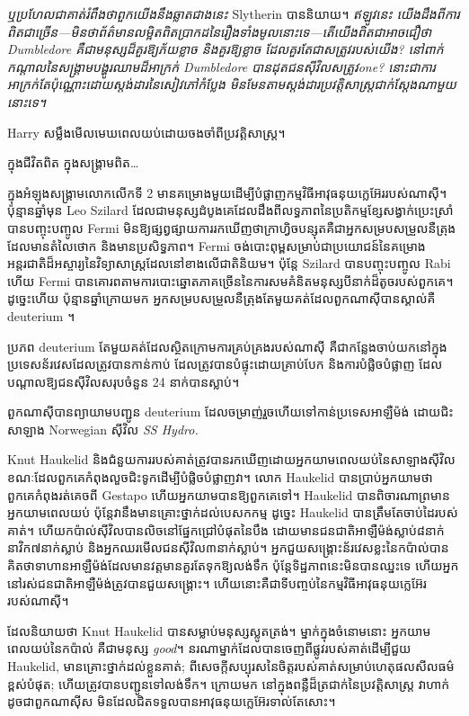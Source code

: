 \emph{ឬប្រហែលជាគាត់រំពឹងថាពួកយើងនឹងឆ្លាតជាងនេះ} Slytherin បាននិយាយ។ \emph{ឥឡូវនេះ យើងដឹងពីការពិតជាច្រើន—មិនថាព័ត៌មានលម្អិតពិតប្រាកដនៃរឿងទាំងមូលនោះទេ—តើយើងពិតជាអាចជឿថា Dumbledore គឺជាមនុស្សដ៏គួរឱ្យភ័យខ្លាច និងគួរឱ្យខ្លាច ដែលគួរតែជាសត្រូវរបស់យើង? នៅពាក់កណ្តាលនៃសង្រ្គាមបង្ហូរឈាមដ៏អាក្រក់ Dumbledore បានដុតជនស៊ីវិលសត្រូវ\emph{one}? នោះជាការអាក្រក់តែប៉ុណ្ណោះដោយស្តង់ដារនៃសៀវភៅកំប្លែង មិនមែនតាមស្តង់ដារប្រវត្តិសាស្ត្រជាក់ស្តែងណាមួយនោះទេ។}

Harry សម្លឹងមើលមេឃពេលយប់ដោយចងចាំពីប្រវត្តិសាស្ត្រ។

ក្នុងជីវិតពិត ក្នុងសង្រ្គាមពិត…

ក្នុងអំឡុងសង្គ្រាមលោកលើកទី 2 មានគម្រោងមួយដើម្បីបំផ្លាញកម្មវិធីអាវុធនុយក្លេអ៊ែររបស់ណាស៊ី។ ប៉ុន្មានឆ្នាំមុន Leo Szilard ដែលជាមនុស្សដំបូងគេដែលដឹងពីលទ្ធភាពនៃប្រតិកម្មខ្សែសង្វាក់ប្រេះស្រាំបានបញ្ចុះបញ្ចូល Fermi មិនឱ្យផ្សព្វផ្សាយការរកឃើញថាក្រាហ្វិចបន្សុតគឺជាអ្នកសម្របសម្រួលនឺត្រុងដែលមានតំលៃថោក និងមានប្រសិទ្ធភាព។ Fermi ចង់បោះពុម្ពសម្រាប់ជាប្រយោជន៍នៃគម្រោងអន្តរជាតិដ៏អស្ចារ្យនៃវិទ្យាសាស្រ្តដែលនៅខាងលើជាតិនិយម។ ប៉ុន្តែ Szilard បានបញ្ចុះបញ្ចូល Rabi ហើយ Fermi បានគោរពតាមការបោះឆ្នោតភាគច្រើននៃការសមគំនិតមនុស្សបីនាក់ដ៏តូចរបស់ពួកគេ។ ដូច្នេះហើយ ប៉ុន្មានឆ្នាំក្រោយមក អ្នកសម្របសម្រួលនឺត្រុងតែមួយគត់ដែលពួកណាស៊ីបានស្គាល់គឺ deuterium ។

ប្រភព deuterium តែមួយគត់ដែលស្ថិតក្រោមការគ្រប់គ្រងរបស់ណាស៊ី គឺជាកន្លែងចាប់យកនៅក្នុងប្រទេសន័រវេសដែលត្រូវបានកាន់កាប់ ដែលត្រូវបានបំផ្ទុះដោយគ្រាប់បែក និងការបំផ្លិចបំផ្លាញ ដែលបណ្តាលឱ្យជនស៊ីវិលសរុបចំនួន 24 នាក់បានស្លាប់។

ពួកណាស៊ីបានព្យាយាមបញ្ជូន deuterium ដែលចម្រាញ់រួចហើយទៅកាន់ប្រទេសអាឡឺម៉ង់ ដោយជិះសាឡាង Norwegian ស៊ីវិល \emph{SS Hydro.}

Knut Haukelid និងជំនួយការរបស់គាត់ត្រូវបានរកឃើញដោយអ្នកយាមពេលយប់នៃសាឡាងស៊ីវិល ខណៈដែលពួកគេកំពុងលួចជិះទូកដើម្បីបំផ្លិចបំផ្លាញវា។ លោក Haukelid បានប្រាប់អ្នកយាមថា ពួកគេកំពុងរត់គេចពី Gestapo ហើយអ្នកយាមបានឱ្យពួកគេទៅ។ Haukelid បានពិចារណាព្រមានអ្នកយាមពេលយប់ ប៉ុន្តែវានឹងមានគ្រោះថ្នាក់ដល់បេសកកម្ម ដូច្នេះ Haukelid បានត្រឹមតែចាប់ដៃរបស់គាត់។ ហើយ​កប៉ាល់​ស៊ីវិល​បាន​លិច​នៅ​ផ្នែក​ជ្រៅ​បំផុត​នៃ​បឹង ដោយ​មាន​ជនជាតិ​អាឡឺម៉ង់​ស្លាប់​៨​នាក់ ​នាវិក​៧​នាក់​ស្លាប់ និង​អ្នក​ឈរ​មើល​ជន​ស៊ីវិល​៣​នាក់​ស្លាប់។ អ្នកជួយសង្គ្រោះន័រវេសខ្លះនៃកប៉ាល់បានគិតថាទាហានអាឡឺម៉ង់ដែលមានវត្តមានគួរតែទុកឱ្យលង់ទឹក ប៉ុន្តែទិដ្ឋភាពនេះមិនបានឈ្នះទេ ហើយអ្នកនៅរស់ជនជាតិអាឡឺម៉ង់ត្រូវបានជួយសង្គ្រោះ។ ហើយនោះគឺជាទីបញ្ចប់នៃកម្មវិធីអាវុធនុយក្លេអ៊ែររបស់ណាស៊ី។

ដែលនិយាយថា Knut Haukelid បានសម្លាប់មនុស្សស្លូតត្រង់។ ម្នាក់ក្នុងចំនោមនោះ អ្នកយាមពេលយប់នៃកប៉ាល់ គឺជាមនុស្ស \emph{good}។ នរណាម្នាក់ដែលបានចេញពីផ្លូវរបស់គាត់ដើម្បីជួយ Haukelid, មានគ្រោះថ្នាក់ដល់ខ្លួនគាត់; ពីសេចក្តីសប្បុរសនៃចិត្តរបស់គាត់សម្រាប់ហេតុផលសីលធម៌ខ្ពស់បំផុត; ហើយត្រូវបានបញ្ជូនទៅលង់ទឹក។ ក្រោយមក នៅក្នុងពន្លឺដ៏ត្រជាក់នៃប្រវត្តិសាស្ត្រ វាហាក់ដូចជាពួកណាស៊ីស មិនដែលជិតទទួលបានអាវុធនុយក្លេអ៊ែរទាល់តែសោះ។

